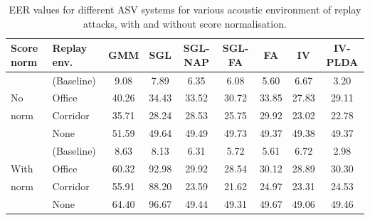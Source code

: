 \begin{table}
\begin{center}
    \begin{tabular}{ l l || c c c c c c c}
    \hline
Score norm & Replay env. &  GMM & SGL & SGL-NAP  & SGL-FA & FA & IV & IV-PLDA \\ 

 \hline \hline
& (Baseline) & 9.08 & 7.89 & 6.35 & 6.08 & 5.60 & 6.67 & 3.20\\
No & Office  & 40.26 & 34.43 & 33.52 & 30.72 & 33.85 & 27.83 & 29.11\\
norm & Corridor & 35.71 & 28.24 & 28.53 & 25.75 & 29.92 & 23.02 & 22.78\\
& None & 51.59 & 49.64 & 49.49 & 49.73 & 49.37 & 49.38 & 49.37\\
\hline
& (Baseline) & 8.63 & 8.13 & 6.31 & 5.72 & 5.61 & 6.72 & 2.98\\
With & Office  & 60.32 & 92.98 & 29.92 & 28.54 & 30.12 & 28.89 & 30.30\\
norm & Corridor & 55.91 & 88.20 & 23.59 & 21.62 & 24.97 & 23.31 & 24.53\\
& None & 64.40 & 96.67 & 49.44 & 49.31 & 49.67 & 49.06 & 49.46\\
\hline
    \end{tabular}
    \caption{EER values for different ASV systems for various acoustic environment of replay attacks, with and without score normalisation. }
		\label{tab::results_EER}
   \end{center}
\end{table}


